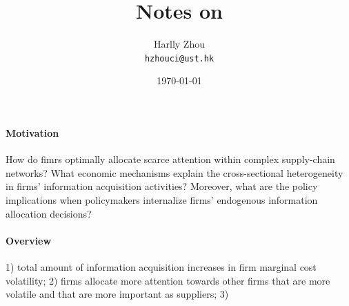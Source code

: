 \documentclass[12pt]{article}
\title{Notes on \cite{fangInattentiveNetworkEvidence2025}}
\author{Harlly Zhou \\ \texttt{hzhouci@ust.hk}}
\date{\today}
\numberwithin{equation}{section}
\begin{document}
\maketitle

\paragraph{Motivation} How do fimrs optimally allocate scarce attention within complex supply-chain networks? What economic mechanisms explain the cross-sectional heterogeneity in firms' information acquisition activities? Moreover, what are the policy implications when policymakers internalize firms' endogenous information allocation decisions?

\paragraph{Overview} 1) total amount of information acquisition increases in firm marginal cost volatility; 2) firms allocate more attention towards other firms that are more volatile and that are more important as suppliers; 3)






\end{document}
